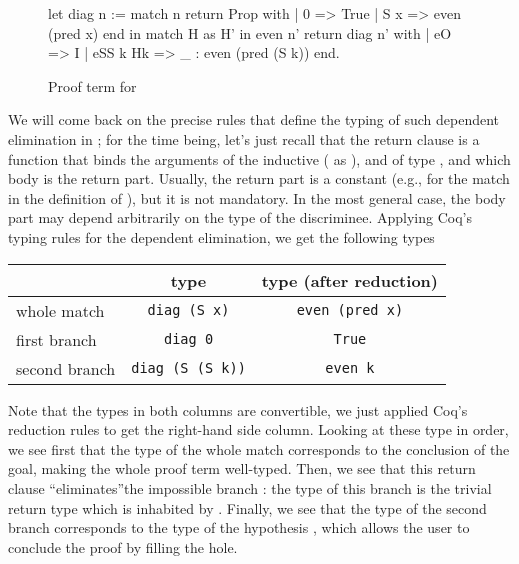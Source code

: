 \documentclass{llncs}
\begin{document}
\begin{figure}
  \centering

\begin{multicols}{2}
\begin{coq}
let diag n := 
  match n return Prop with
  | 0 => True
  | S x =>  even (pred x)
  end in
match H as H' in even n' return diag n' 
with 
| eO => I  
| eSS k Hk => _ : even (pred (S k)) end. 
\end{coq}
\end{multicols}
\caption{Proof term for }
  \label{fig:proof-term}
\end{figure}

We will come back on the precise rules that define the typing of such
dependent elimination in ; for the
time being, let's just recall that the return clause %
 is a function that binds the arguments of
the inductive ( as ), and  of type
, and which body is the return part. Usually, the return
part is a constant (e.g.,  for the match in the definition
of ), but it is not mandatory. In the most general
case, the body part may depend arbitrarily on the type of the
discriminee.
%
Applying Coq's typing rules for the dependent elimination, we get the
following types 
%
\begin{center}
  \begin{tabular}{l@{\quad}cc}
     & type & type (after reduction) \\
     \hline
    whole match 
    & \lstinline[language=Coq, basicstyle=\normalsize]|diag (S x)| 
    & \lstinline[language=Coq, basicstyle=\normalsize]|even (pred x)| \\
    
    first branch 
    & \lstinline[language=Coq, basicstyle=\normalsize]|diag 0|
    & \lstinline[language=Coq, basicstyle=\normalsize]|True| \\
    
    second branch 
    & \lstinline[language=Coq, basicstyle=\normalsize]|diag (S (S k))|  
    & \lstinline[language=Coq, basicstyle=\normalsize]|even k| \\
\end{tabular}
\end{center}
%
Note that the types in both columns are convertible, we just applied
Coq's reduction rules to get the right-hand side column.
%
Looking at these type in order, we see first that the type of the
whole match corresponds to the conclusion of the goal, making the
whole proof term well-typed.
%
Then, we see that this return clause ``eliminates''the impossible
branch : the type of this branch is the trivial return type
 which is inhabited by .
%
Finally, we see that the type of the second branch corresponds to the
type of the hypothesis , which allows the user to conclude
the proof by filling the hole.
\end{document}
